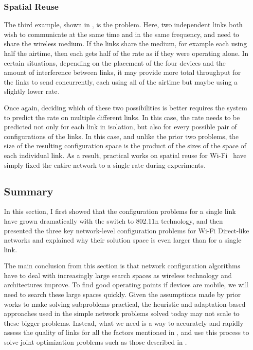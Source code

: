 \subsubsection{Spatial Reuse}
The third example, shown in , is the  problem. Here, two independent links both wish to communicate at the same time and in the same frequency, and need to share the wireless medium. If the links share the medium, for example each using half the airtime, then each gets half of the rate as if they were operating alone. In certain situations, depending on the placement of the four devices and the amount of interference between links, it may provide more total throughput for the links to send concurrently, each using all of the airtime but maybe using a slightly lower rate.

Once again, deciding which of these two possibilities is better requires the system to predict the rate on multiple different links. In this case, the rate needs to be predicted not only for each link in isolation, but also for every possible pair of configurations of the links. In this case, and unlike the prior two problems, the size of the resulting configuration space is the product of the sizes of the space of each individual link. As a result, practical works on spatial reuse for Wi-Fi~\cite{Shrivastava_CENTAUR,Vutukuru_CMAP} have simply fixed the entire network to a single rate during experiments.

\subsection{Summary}
In this section, I first showed that the configuration problems for a single link have grown dramatically with the switch to 802.11n technology, and then presented the three key network-level configuration problems for Wi-Fi Direct-like networks and explained why their solution space is even larger than for a single link.

The main conclusion from this section is that network configuration algorithms have to deal with increasingly large search spaces as wireless technology and architectures improve. To find good operating points if devices are mobile, we will need to search these large spaces quickly.
Given the assumptions made by prior works to make solving subproblems practical, the heuristic and adaptation-based approaches used in the simple network problems solved today may not scale to these bigger problems. %
Instead, what we need is a way to accurately and rapidly assess the quality of links for all the factors mentioned in , and use this process to solve joint optimization problems such as those described in .


